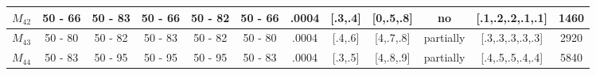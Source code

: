 \begin{table}[H]
{\begin{tabular}{|c|c|c|c|c|c|c|c|c|c|c|c|}
\rowcolor[HTML]{FFFFFF} 
$M_{42}$                                                                             & 50 - 66                                 & 50 - 83                                 & 50 - 66                                 & 50 - 82                                 & 50 - 66                                 & .0004                                                                                   & {[}.3,.4{]}                                                                                 & {[}0,.5,.8{]}                                                                               & no                                                                                        & {[}.1,.2,.2,.1,.1{]}                                                                    & 1460                                                                                      \\ \hline
\rowcolor[HTML]{FFFFFF} 
$M_{43}$                                                                             & 50 - 80                                 & 50 - 82                                 & 50 - 83                                 & 50 - 82                                 & 50 - 80                                 & .0004                                                                                   & {[}.4,.6{]}                                                                                 & {[}4,.7,.8{]}                                                                               & partially                                                                                 & {[}.3,.3,.3,.3,.3{]}                                                                    & 2920                                                                                      \\ \hline
\rowcolor[HTML]{FFFFFF} 
$M_{44}$                                                                             & 50 - 83                                 & 50 - 95                                 & 50 - 95                                 & 50 - 95                                 & 50 - 83                                 & .0004                                                                                   & {[}.3,.5{]}                                                                                 & {[}4,.8,.9{]}                                                                               & partially                                                                                 & {[}.4,.5,.5,.4,.4{]}                                                                    & 5840                                                                                      \\ \hline

\end{tabular}}
\end{table}
